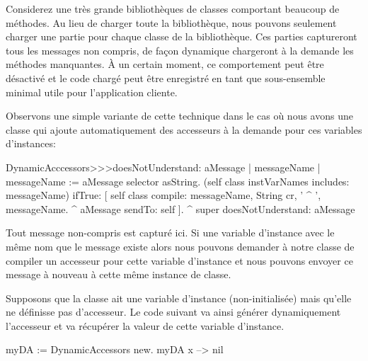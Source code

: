 \documentclass[a4paper,10pt,twoside]{book}
\begin{document}
Considerez une très grande bibliothèques de classes comportant beaucoup de méthodes. Au lieu de charger toute la bibliothèque, nous pouvons seulement charger une partie pour chaque classe de la bibliothèque. Ces parties captureront tous les messages non compris, de façon dynamique chargeront à la demande les méthodes manquantes. À un certain moment, ce comportement peut être désactivé et le code chargé peut être enregistré en tant que sous-ensemble minimal utile pour l'application cliente.


Observons une simple variante de cette technique dans le cas où nous avons une classe qui ajoute automatiquement des accesseurs à la demande pour ces variables d'instances:

\begin{code}{}
DynamicAcccessors>>>doesNotUnderstand: aMessage
	| messageName |
	messageName := aMessage selector asString.
	(self class instVarNames includes: messageName)
		ifTrue: [
			self class compile: messageName, String cr, ' ^ ', messageName.
			^ aMessage sendTo: self ].
	^ super doesNotUnderstand: aMessage
\end{code}
Tout message non-compris est capturé ici. Si une variable d'instance avec le même nom que le message existe alors nous pouvons demander à notre classe de compiler un accesseur pour cette variable d'instance et nous pouvons envoyer ce message à nouveau
à cette même instance de classe.

Supposons que la classe  ait une variable d'instance
(non-initialisée)  mais qu'elle ne définisse pas d'accesseur.
Le code suivant va ainsi générer dynamiquement l'accesseur et va récupérer la valeur de cette variable d'instance.
\begin{code}{}
myDA := DynamicAccessors new.
myDA x --> nil
\end{code}
\end{document}
